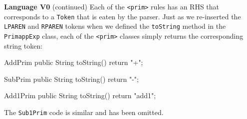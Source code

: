 \begin{minipage}[t]{\sw}
\slidenumber
\LARGE
{\bf Language V0} (continued)\exx
Each of the \verb'<prim>' rules
has an RHS that corresponds to a \verb'Token'
that is eaten by the parser.
Just as we re-inserted the \verb'LPAREN' and \verb'RPAREN' tokens
when we defined the \verb'toString' method
in the \verb'PrimappExp' class,
each of the \verb'<prim>' classes simply returns
the corresponding string token:

\large
\begin{qv}
AddPrim
    public String toString() {
        return "+";
    }

SubPrim
    public String toString() {
        return "-";
    }

Add1Prim
    public String toString() {
        return "add1";
    }
\end{qv}
\LARGE
The \verb'Sub1Prim' code is similar and has been omitted.
\end{minipage}
